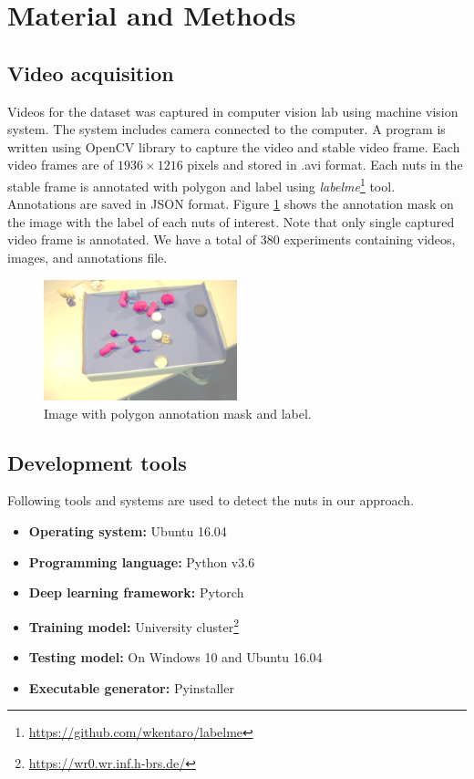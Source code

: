 \documentclass[journal,onecolumn,12pt]{IEEEtran}
\begin{document}
\section{Material and Methods}
\subsection{Video acquisition}
Videos for the dataset was captured in computer vision lab using machine vision system. The system includes camera connected to the computer. A program is written using OpenCV library to capture the video and stable video frame. Each video frames are of $1936 \times 1216$ pixels and stored in .avi format. Each nuts in the stable frame is annotated with polygon and label using \textit{labelme}\footnote{\url{https://github.com/wkentaro/labelme}} tool. Annotations are saved in JSON format. Figure \ref{fig:bb_image3} shows the annotation mask on the image with the label of each nuts of interest. Note that only single captured video frame is annotated. We have a total of 380 experiments containing videos, images, and annotations file.
\begin{figure}[h]
	\centering
	\includegraphics[width=0.5\textwidth]{images/bb_image3}
	\caption{Image with polygon annotation mask and label.}
	\label{fig:bb_image3}
\end{figure}

\subsection{Development tools}
Following tools and systems are used to detect the nuts in our approach.
\begin{itemize}
	\item \textbf{Operating system:} Ubuntu 16.04
	\item \textbf{Programming language:} Python v3.6
	\item \textbf{Deep learning framework:} Pytorch
	\item \textbf{Training model:} University cluster\footnote{\url{https://wr0.wr.inf.h-brs.de/}} 
	\item \textbf{Testing model:} On Windows 10 and Ubuntu 16.04
	\item \textbf{Executable generator:} Pyinstaller
\end{itemize}
\end{document}
